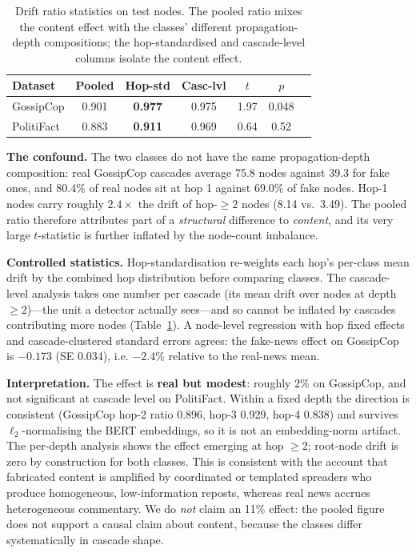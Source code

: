 \documentclass[10pt,twocolumn]{article}
\begin{document}
\begin{table}[t]
  \centering
  \caption{Drift ratio statistics on test nodes. The pooled ratio mixes the
  content effect with the classes' different propagation-depth compositions;
  the hop-standardised and cascade-level columns isolate the content effect.}
  \label{tab:drift}
  \small
  \setlength{\tabcolsep}{4pt}
  \begin{tabular}{lcccccc}
    \toprule
    Dataset & Pooled & Hop-std & Casc-lvl & $t$ & $p$ \\
    \midrule
    GossipCop & 0.901 & \textbf{0.977} & 0.975 & 1.97 & 0.048 \\
    PolitiFact & 0.883 & \textbf{0.911} & 0.969 & 0.64 & 0.52 \\
    \bottomrule
  \end{tabular}
\end{table}

\textbf{The confound.} The two classes do not have the same
propagation-depth composition: real GossipCop cascades average 75.8 nodes
against 39.3 for fake ones, and 80.4\% of real nodes sit at hop 1 against
69.0\% of fake nodes. Hop-1 nodes carry roughly $2.4{\times}$ the drift of
hop-$\ge 2$ nodes (8.14 vs.\ 3.49). The pooled ratio therefore attributes part
of a \emph{structural} difference to \emph{content}, and its very large
$t$-statistic is further inflated by the node-count imbalance.

\textbf{Controlled statistics.} Hop-standardisation re-weights each hop's
per-class mean drift by the combined hop distribution before comparing classes.
The cascade-level analysis takes one number per cascade (its mean drift over
nodes at depth $\ge 2$)---the unit a detector actually sees---and so cannot be
inflated by cascades contributing more nodes (Table~\ref{tab:drift}). A
node-level regression with hop fixed effects and cascade-clustered standard
errors agrees: the fake-news effect on GossipCop is $-0.173$ (SE 0.034), i.e.
\textbf{$-2.4\%$} relative to the real-news mean.

\textbf{Interpretation.} The effect is \textbf{real but modest}: roughly 2\%
on GossipCop, and not significant at cascade level on PolitiFact. Within a
fixed depth the direction is consistent (GossipCop hop-2 ratio 0.896, hop-3
0.929, hop-4 0.838) and survives $\ell_2$-normalising the BERT embeddings, so
it is not an embedding-norm artifact. The per-depth analysis shows the effect
emerging at hop $\ge 2$; root-node drift is zero by construction for both
classes. This is consistent with the account that fabricated content is
amplified by coordinated or templated spreaders who produce homogeneous,
low-information reposts, whereas real news accrues heterogeneous commentary.
We do \emph{not} claim an 11\% effect: the pooled figure does not support a
causal claim about content, because the classes differ systematically in
cascade shape.
\end{document}
